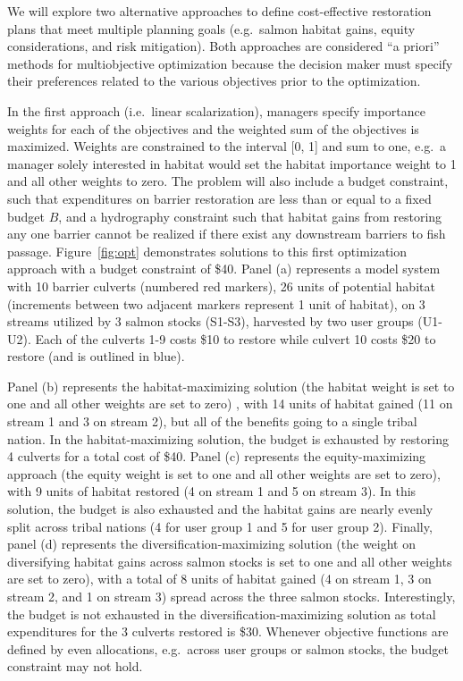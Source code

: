 \documentclass[12pt]{elsarticle}
\begin{document}
We will explore two alternative approaches to define cost-effective restoration plans that meet multiple planning goals (e.g.\ salmon habitat gains, equity considerations, and risk mitigation). Both approaches are considered ``a priori'' methods for multiobjective optimization because the decision maker must specify their preferences related to the various objectives prior to the optimization. 

In the first approach (i.e.\ linear scalarization), managers specify importance weights for each of the objectives and the weighted sum of the objectives is maximized. Weights are constrained to the interval [0, 1] and sum to one, e.g.\ a manager solely interested in habitat would set the habitat importance weight to 1 and all other weights to zero. The problem will also include a budget constraint, such that expenditures on barrier restoration are less than or equal to a fixed budget $B$, and a hydrography constraint such that habitat gains from restoring any one barrier cannot be realized if there exist any downstream barriers to fish passage. Figure~\ref{fig:opt} demonstrates solutions to this first optimization approach with a budget constraint of \$40. Panel (a) represents a model system with 10 barrier culverts (numbered red markers), 26 units of potential habitat (increments between two adjacent markers represent 1 unit of habitat), on 3 streams utilized by 3 salmon stocks (S1-S3), harvested by two user groups (U1-U2). Each of the culverts 1-9 costs \$10 to restore while culvert 10 costs \$20 to restore (and is outlined in blue).

Panel (b) represents the habitat-maximizing solution (the habitat weight is set to one and all other weights are set to zero) , with 14 units of habitat gained (11 on stream 1 and 3 on stream 2), but all of the benefits going to a single tribal nation. In the habitat-maximizing solution, the budget is exhausted by restoring 4 culverts for a total cost of \$40. Panel (c) represents the equity-maximizing approach (the equity weight is set to one and all other weights are set to zero), with 9 units of habitat restored (4 on stream 1 and 5 on stream 3). In this solution, the budget is also exhausted and the habitat gains are nearly evenly split across tribal nations (4 for user group 1 and 5 for user group 2). Finally, panel (d) represents the diversification-maximizing solution (the weight on diversifying habitat gains across salmon stocks is set to one and all other weights are set to zero), with a total of 8 units of habitat gained (4 on stream 1, 3 on stream 2, and 1 on stream 3) spread across the three salmon stocks. Interestingly, the budget is not exhausted in the diversification-maximizing solution as total expenditures for the 3 culverts restored is \$30. Whenever objective functions are defined by even allocations, e.g.\ across user groups or salmon stocks, the budget constraint may not hold.
\end{document}

